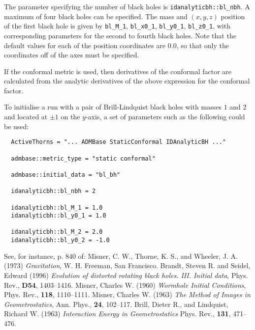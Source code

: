 \documentclass{article}
\begin{document}
The parameter specifying the number of black holes is
\texttt{idanalyticbh::bl\_nbh}. A maximum of four black holes can be
specified. The mass and $(x,y,z)$ position of the first black hole is
given by \texttt{bl\_M\_1}, \texttt{bl\_x0\_1}, \texttt{bl\_y0\_1},
\texttt{bl\_z0\_1}, with corresponding parameters for the second to
fourth black holes. Note that the default values for each of the
position coordinates are $0.0$, so that only the coordinates off
of the axes must be specified.

If the conformal metric is used, then derivatives of the conformal
factor are calculated from the analytic derivatives of the above
expression for the conformal factor.

To initialise a run with a pair of Brill-Lindquist black holes with
masses $1$ and $2$ and located at $\pm 1$ on the $y$-axis, a set of
parameters such as the following could be used:
\begin{verbatim}
  ActiveThorns = "... ADMBase StaticConformal IDAnalyticBH ..."

  admbase::metric_type = "static conformal"

  admbase::initial_data = "bl_bh"

  idanalyticbh::bl_nbh = 2

  idanalyticbh::bl_M_1 = 1.0
  idanalyticbh::bl_y0_1 = 1.0

  idanalyticbh::bl_M_2 = 2.0
  idanalyticbh::bl_y0_2 = -1.0
\end{verbatim}

\begin{thebibliography}{9}
    See, for instance, p. 840 of:
    Misner, C. W., Thorne, K. S., and Wheeler, J. A. (1973)
    \emph{Gravitation}, W. H. Freeman, San Francisco.
    Brandt, Steven R. and Seidel, Edward (1996)
    \emph{Evolution of distorted rotating black holes. III. Initial
    data},
    Phys. Rev., \textbf{D54}, 1403--1416.
    Misner, Charles W. (1960)
    \emph{Wormhole Initial Conditions},
    Phys. Rev., \textbf{118}, 1110--1111.
    Misner, Charles W. (1963)
    \emph{The Method of Images in Geometrostatics},
    Ann. Phys., \textbf{24}, 102--117.
    Brill, Dieter R., and Lindquist, Richard W. (1963)
    \emph{Interaction Energy in Geometrostatics}
    Phys. Rev., \textbf{131}, 471--476.
\end{thebibliography}
\end{document}

